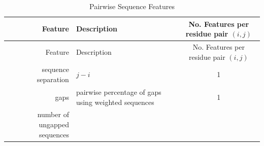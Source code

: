 \documentclass[12pt,a4paper,twoside]{book}
\theoremstyle{definition}
\theoremstyle{definition}
\theoremstyle{remark}
\begin{document}
\begin{longtable}[]{@{}rlc@{}}
\caption{Pairwise Sequence Features}\tabularnewline
\toprule
\begin{minipage}[b]{0.23\columnwidth}\raggedleft\strut
Feature\strut
\end{minipage} & \begin{minipage}[b]{0.50\columnwidth}\raggedright\strut
Description\strut
\end{minipage} & \begin{minipage}[b]{0.18\columnwidth}\centering\strut
No. Features per residue pair \((i, j)\)\strut
\end{minipage}\tabularnewline
\midrule
\endfirsthead
\toprule
\begin{minipage}[b]{0.23\columnwidth}\raggedleft\strut
Feature\strut
\end{minipage} & \begin{minipage}[b]{0.50\columnwidth}\raggedright\strut
Description\strut
\end{minipage} & \begin{minipage}[b]{0.18\columnwidth}\centering\strut
No. Features per residue pair \((i, j)\)\strut
\end{minipage}\tabularnewline
\midrule
\endhead
\begin{minipage}[t]{0.23\columnwidth}\raggedleft\strut
sequence separation\strut
\end{minipage} & \begin{minipage}[t]{0.50\columnwidth}\raggedright\strut
\(j-i\)\strut
\end{minipage} & \begin{minipage}[t]{0.18\columnwidth}\centering\strut
1\strut
\end{minipage}\tabularnewline
\begin{minipage}[t]{0.23\columnwidth}\raggedleft\strut
gaps\strut
\end{minipage} & \begin{minipage}[t]{0.50\columnwidth}\raggedright\strut
pairwise percentage of gaps using weighted sequences\strut
\end{minipage} & \begin{minipage}[t]{0.18\columnwidth}\centering\strut
1\strut
\end{minipage}\tabularnewline
\begin{minipage}[t]{0.23\columnwidth}\raggedleft\strut
number of ungapped sequences\strut
\end{minipage} & \begin{minipage}[t]{0.50\columnwidth}\raggedright\strut

\end{minipage}
\end{longtable}
\end{document}

